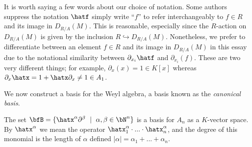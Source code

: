 \begin{rmk}
	It is worth saying a few words about our choice of notation. Some authors suppress the notation $\hatf$ simply write ``$f$'' to refer interchangeably to $f \in R$ and its image in $D_{R/A}(M)$. This is reasonable, especially since the $R$-action on $D_{R/A}(M)$ is given by the inclusion $R\hookrightarrow D_{R/A}(M)$. Nonetheless, we prefer to differentiate between an element $f\in R$ and its image in $D_{R/A}(M)$ in this essay due to the notational similarity between $\partial_{x_i}\hatf$ and $\partial_{x_i}(f)$. These are two very different things; for example, $\partial_x(x) = 1 \in K[x]$ whereas $\partial_x\hatx = 1 + \hatx\partial_x \neq 1 \in A_1$.
\end{rmk}

We now construct a basis for the Weyl algebra, a basis known as the \emph{canonical basis}.
\begin{lem}\label{lem:canonical-basis}
	The set $\bfB = \{\hatx^\alpha\partial^\beta ~\mid~ \alpha,\beta \in \bN^n\}$ is a basis for $A_n$ as a $K$-vector space. By $\hatx^\alpha$ we mean the operator $\hatx^\alpha_1\cdot...\cdot \hatx^\alpha_n$, and the degree of this monomial is the length of $\alpha$ defined $|\alpha| = \alpha_1 + ... + \alpha_n$.
\end{lem}
